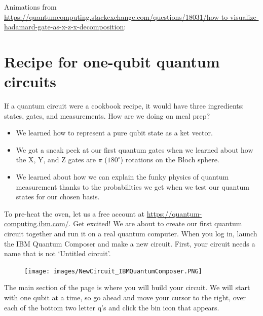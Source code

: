 \documentclass{article}
\theoremstyle{definition}
\begin{document}
Animations from \url{https://quantumcomputing.stackexchange.com/questions/18031/how-to-visualize-hadamard-gate-as-x-z-x-decomposition}:

\noindent%
\begin{minipage}[t]{0.45\linewidth}
	\begin{frame}{}
	\end{frame}\end{minipage}%
\hfill%
\begin{minipage}[t]{0.45\linewidth}
	\begin{frame}{}
	\end{frame}
\end{minipage}

\newpage
\section{Recipe for one-qubit quantum circuits}
If a quantum circuit were a cookbook recipe, it would have three ingredients: states, gates, and measurements.
How are we doing on meal prep?
\begin{itemize}
	\item We learned how to represent a pure qubit state as a ket vector.
	\item We got a sneak peek at our first quantum gates when we learned about how the X, Y, and Z gates are $\pi$ ($180^{\circ}$) rotations on the Bloch sphere.
	\item We learned about how we can explain the funky physics of quantum measurement thanks to the probabilities we get when we test our quantum states for our chosen basis.
\end{itemize}
To pre-heat the oven, let us a free account at \url{https://quantum-computing.ibm.com/}.  Get excited!  We are about to create our first quantum circuit together and run it on a real quantum computer.
When you log in, launch the IBM Quantum Composer and make a new circuit.
First, your circuit needs a name that is not `Untitled circuit'.
\begin{figure}[H]
	\texttt{[image: images/NewCircuit\_IBMQuantumComposer.PNG]}
\end{figure}
The main section of the page is where you will build your circuit.  We will start with one qubit at a time, so go ahead and move your cursor to the right, over each of the bottom two letter q's and click the bin icon that appears.
\end{document}
